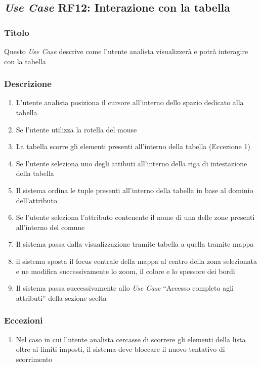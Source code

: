     \subsection{\textit{Use Case} RF12: Interazione con la tabella}
        \subsubsection{Titolo}
            Questo \textit{Use Case} descrive come l'utente analista visualizzerà e potrà interagire con la tabella
        \subsubsection{Descrizione}
            \begin{enumerate}
                \item L'utente analista posiziona il cursore all'interno dello spazio dedicato alla tabella
                \item Se l'utente utilizza la rotella del mouse
                \item La tabella scorre gli elementi presenti all'interno della tabella (Eccezione 1)
                \item Se l'utente seleziona uno degli attibuti all'interno della riga di intestazione della tabella
                \item Il sistema ordina le tuple presenti all'interno della tabella in base al dominio dell'attributo
                \item Se l'utente seleziona l'attributo contenente il nome di una delle zone presenti all'interno del comune
                \item Il sistema passa dalla visualizzazione tramite tabella a quella tramite mappa
                \item il sistema sposta il focus centrale della mappa al centro della zona selezionata e ne modifica successivamente lo zoom, il colore e lo spessore dei bordi
                \item Il sistema passa successivamente allo \textit{Use Case} ``Accesso completo agli attributi'' della sezione scelta
            \end{enumerate}
        \subsubsection{Eccezioni}
            \begin{enumerate}
                \item Nel caso in cui l'utente analista cercasse di scorrere gli elementi della lista oltre ai limiti imposti, il sistema deve bloccare il nuovo tentativo di scorrimento
            \end{enumerate}
